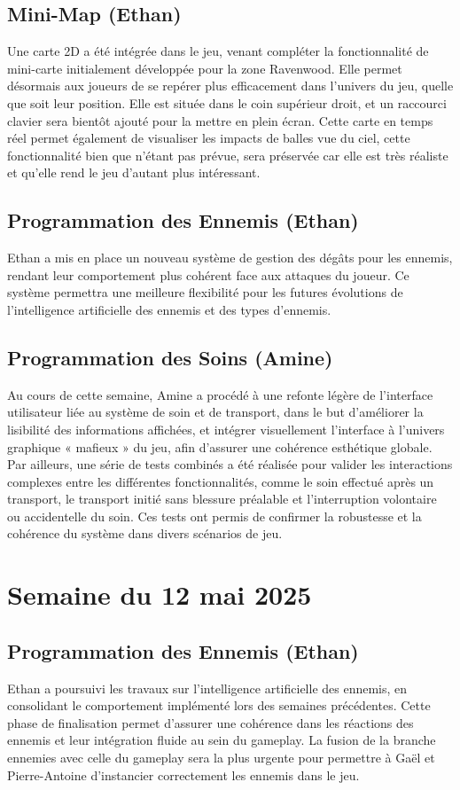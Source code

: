 \documentclass{report}
\begin{document}
\subsection*{Mini-Map (Ethan)}
Une carte 2D a été intégrée dans le jeu, venant compléter la fonctionnalité de mini-carte initialement développée pour la zone Ravenwood. Elle permet désormais aux joueurs de se repérer plus efficacement dans l’univers du jeu, quelle que soit leur position. Elle est située dans le coin supérieur droit, et un raccourci clavier sera bientôt ajouté pour la mettre en plein écran. Cette carte en temps réel permet également de visualiser les impacts de balles vue du ciel, cette fonctionnalité bien que n’étant pas prévue, sera préservée car elle est très réaliste et qu’elle rend le jeu d’autant plus intéressant.


\subsection*{Programmation des Ennemis (Ethan)}
Ethan a mis en place un nouveau système de gestion des dégâts pour les ennemis, rendant leur comportement plus cohérent face aux attaques du joueur. Ce système permettra une meilleure flexibilité pour les futures évolutions de l'intelligence artificielle des ennemis et des types d’ennemis.

\subsection*{Programmation des Soins (Amine)}
Au cours de cette semaine, Amine a procédé à une refonte légère de l’interface utilisateur liée au système de soin et de transport, dans le but d’améliorer la lisibilité des informations affichées, et intégrer visuellement l’interface à l’univers graphique « mafieux » du jeu, afin d’assurer une cohérence esthétique globale. Par ailleurs, une série de tests combinés a été réalisée pour valider les interactions complexes entre les différentes fonctionnalités, comme le soin effectué après un transport, le transport initié sans blessure préalable et l’interruption volontaire ou accidentelle du soin. Ces tests ont permis de confirmer la robustesse et la cohérence du système dans divers scénarios de jeu.


\newpage
\section{Semaine du 12 mai 2025}

\subsection*{Programmation des Ennemis (Ethan)}
Ethan a poursuivi les travaux sur l’intelligence artificielle des ennemis, en consolidant le comportement implémenté lors des semaines précédentes. Cette phase de finalisation permet d’assurer une cohérence dans les réactions des ennemis et leur intégration fluide au sein du gameplay. La fusion de la branche ennemies avec celle du gameplay sera la plus urgente pour permettre à Gaël et Pierre-Antoine d’instancier correctement les ennemis dans le jeu.
\end{document}
